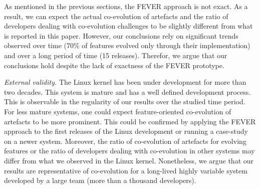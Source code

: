 As mentioned in the previous sections, the FEVER approach is not exact. 
As a result, we can expect the actual co-evolution of artefacts and the ratio of developers
dealing with co-evolution challenges to be slightly different from what is reported in this paper.
However, our conclusions rely on significant trends observed over time (70\% of features evolved only through their implementation) and over 
a long period of time (15 releases).
Therefor, we argue that our conclusions hold despite the lack of exactness of the FEVER prototype.

\textit{External validity.}
The Linux kernel has been under development for more than two decades.
This system is mature and has a well defined development process.
This is observable in the regularity of our results over the studied time period.
For less mature systems, one could expect feature-oriented co-evolution of artefacts to be 
more prominent.
This could be confirmed by applying the FEVER approach to the first releases of the Linux development
or running a case-study on a newer system.
Moreover, the ratio of co-evolution of artefacts for evolving features
or the ratio of developers dealing with co-evolution in other systems may differ from what we 
observed in the Linux kernel.
Nonetheless, we argue that our results are representative of co-evolution for a long-lived highly variable system
developed by a large team (more than a thousand developers).



